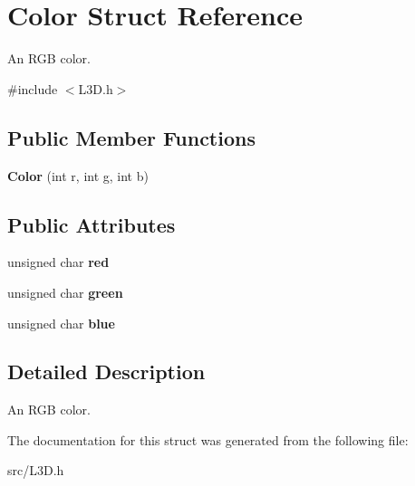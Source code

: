 \hypertarget{structColor}{}\section{Color Struct Reference}
\label{structColor}


An R\+GB color.  




{\ttfamily \#include $<$L3\+D.\+h$>$}

\subsection*{Public Member Functions}
\begin{DoxyCompactItemize}
\item 
\mbox{\label{structColor_a154354d16fc63294355979095a3b6d65}} 
{\bfseries Color} (int r, int g, int b)
\end{DoxyCompactItemize}
\subsection*{Public Attributes}
\begin{DoxyCompactItemize}
\item 
\mbox{\label{structColor_a245f5a423cdaaaeff27047036c24b7ef}} 
unsigned char {\bfseries red}
\item 
\mbox{\label{structColor_a070831365fe6c626bc0020915a917081}} 
unsigned char {\bfseries green}
\item 
\mbox{\label{structColor_a5b425af958edb0e7835eb08daeb90e71}} 
unsigned char {\bfseries blue}
\end{DoxyCompactItemize}


\subsection{Detailed Description}
An R\+GB color. 



The documentation for this struct was generated from the following file\+:\begin{DoxyCompactItemize}
\item 
src/L3\+D.\+h\end{DoxyCompactItemize}
